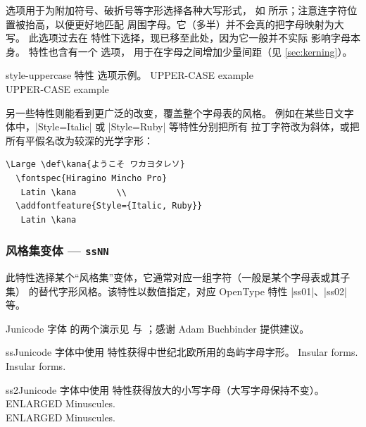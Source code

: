 \documentclass[a4paper]{l3doc}
\begin{document}
 选项用于为附加符号、破折号等字形选择各种大写形式，
如  所示；注意连字符位置被抬高，以便更好地匹配
周围字母。它（多半）并不会真的把字母映射为大写。
此选项过去在  特性下选择，现已移至此处，因为它一般并不实际
影响字母本身。 特性也含有一个  选项，
用于在字母之间增加少量间距（见 \vref{sec:kerning}）。

\begin{Lexample}{style-uppercase}{ 特性  选项示例。}
   UPPER-CASE example \\
   UPPER-CASE example
\end{Lexample}


另一些特性则能看到更广泛的改变，覆盖整个字母表的风格。
例如在某些日文字体中，|Style=Italic| 或 |Style=Ruby| 等特性分别把所有
拉丁字符改为斜体，或把所有平假名改为较深的光学字形：
\begin{Verbatim}[firstline=2]
  \Large \def\kana{ようこそ ワカヨタレソ}
  \fontspec{Hiragino Mincho Pro}
   Latin \kana        \\
  \addfontfeature{Style={Italic, Ruby}}
   Latin \kana
\end{Verbatim}


\subsubsection{风格集变体 --- \texttt{ssNN}}
\label{sec:ot-ss}

此特性选择某个“风格集”变体，它通常对应一组字符（一般是某个字母表或其子集）
的替代字形风格。该特性以数值指定，对应 OpenType 特性 |ss01|、|ss02| 等。

Junicode 字体 的两个演示见 
与 ；感谢 Adam Buchbinder 提供建议。

\begin{Lexample}{ss}{Junicode 字体中使用  特性获得中世纪北欧所用的岛屿字母字形。}
   Insular forms. \\
   Insular forms. \\
\end{Lexample}

\begin{Lexample}{ss2}{Junicode 字体中使用  特性获得放大的小写字母（大写字母保持不变）。}
   ENLARGED Minuscules. \\
   ENLARGED Minuscules. \\
\end{Lexample}
\end{document}
